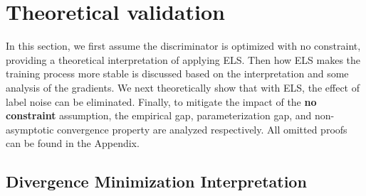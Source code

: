 \documentclass{article} \usepackage{iclr2023_conference,times}
\newcommand{\ls}[0]{ELS\xspace}
\begin{document}
\vspace{-0.1cm}
\section{Theoretical validation}
\vspace{-0.1cm}
In this section, we first assume the discriminator is optimized with no constraint, providing a theoretical interpretation of applying \ls. Then how \ls makes the training process more stable is discussed based on the interpretation and some analysis of the gradients. We next theoretically show that with \ls, the effect of label noise can be eliminated. Finally, to mitigate the impact of the \textbf{no constraint} assumption, the empirical gap, parameterization gap, and non-asymptotic convergence property are analyzed respectively. All omitted proofs can be found in the Appendix.
\subsection{Divergence Minimization Interpretation}\label{sec:js}
\end{document}
